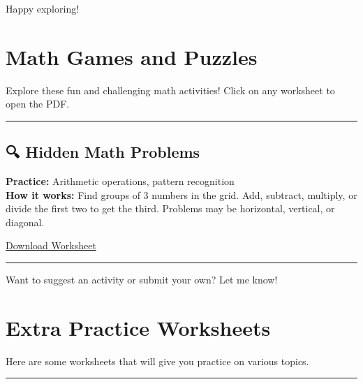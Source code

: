 \documentclass[
  letterpaper,
  DIV=11,
  numbers=noendperiod]{scrreprt}
\begin{document}
Happy exploring!

\chapter*{Math Games and Puzzles}\label{math-games-and-puzzles}


Explore these fun and challenging math activities! Click on any
worksheet to open the PDF.

\begin{center}\rule{0.5\linewidth}{0.5pt}\end{center}

\section*{🔍 Hidden Math Problems}\label{hidden-math-problems}


\textbf{Practice:} Arithmetic operations, pattern recognition\\
\textbf{How it works:} Find groups of 3 numbers in the grid. Add,
subtract, multiply, or divide the first two to get the third. Problems
may be horizontal, vertical, or diagonal.

\href{FindTheHiddenMathProblems.pdf}{Download Worksheet}

\begin{center}\rule{0.5\linewidth}{0.5pt}\end{center}

Want to suggest an activity or submit your own? Let me know!

\chapter*{Extra Practice Worksheets}\label{extra-practice-worksheets-1}


Here are some worksheets that will give you practice on various topics.

\begin{center}\rule{0.5\linewidth}{0.5pt}\end{center}
\end{document}
